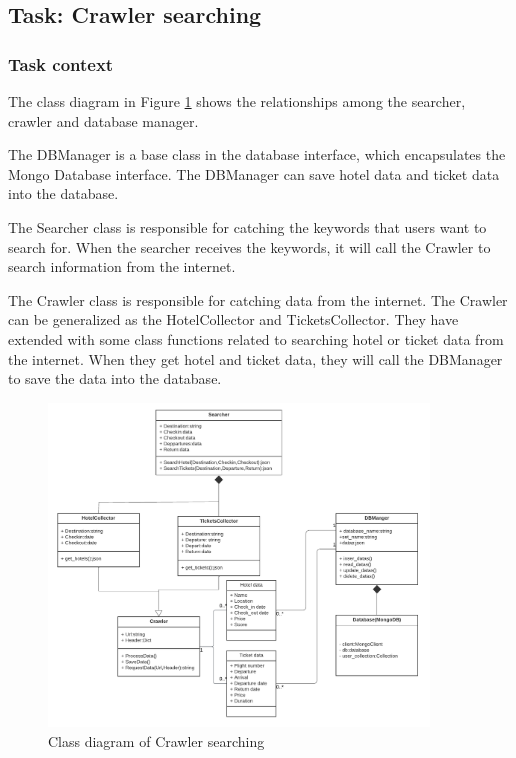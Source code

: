 \documentclass[conference]{IEEEtran}
\begin{document}
\subsection{\textbf{Task: Crawler searching }}



\subsubsection{\textbf{Task context }}
\textbf{}

The class diagram in Figure \ref{crawlerclass1} shows the relationships among the searcher, crawler and database manager. 

The DBManager is a base class in the database interface, which encapsulates the Mongo Database interface. The DBManager can save hotel data and ticket data into the database.

The Searcher class is responsible for catching the keywords that users want to search for. When the searcher receives the keywords, it will call the Crawler to search information from the internet.

The Crawler class is responsible for catching data from the internet. The Crawler can be generalized as the HotelCollector and TicketsCollector. They have extended with some class functions related to searching hotel or ticket data from the internet.  When they get hotel and ticket data, they will call the DBManager to save the data into the database.
\begin{figure}[htbp]
	\centerline{\includegraphics[width=0.9\textwidth]{image/crawler search class1.pdf}}
	\caption{Class diagram of Crawler searching }
	\label{crawlerclass1}
\end{figure}
\end{document}
